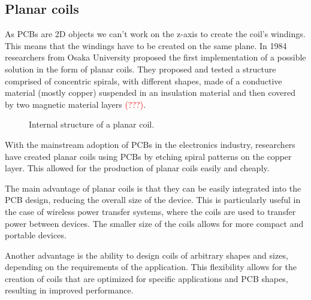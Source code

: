 \subsection{Planar coils}
As PCBs are 2D objects we can't work on the z-axis to create the coil's windings. This means that the windings have to be created on the same plane. 
In 1984 researchers from Osaka University proposed the first implementation of a possible solution in the form of planar coils.
They proposed and tested a structure comprised of concentric spirals, with different shapes, made of a conductive material (mostly copper) suspended in an insulation material and then covered by two magnetic material layers \textcolor{red}{(???)}\cite{OG_plan_coils}. %

\begin{figure}
    \centering
    \resizebox{.8\linewidth}{!}{}
    \caption{Internal structure of a planar coil.}
    \label{fig:Planar_coil_structure}
\end{figure}


With the mainstream adoption of PCBs in the electronics industry, researchers have created planar coils using PCBs by etching spiral patterns on the copper layer. This allowed for the production of planar coils easily and cheaply.

The main advantage of planar coils is that they can be easily integrated into the PCB design, reducing the overall size of the device. This is particularly useful in the case of wireless power transfer systems, where the coils are used to transfer power between devices. The smaller size of the coils allows for more compact and portable devices.

Another advantage is the ability to design coils of arbitrary shapes and sizes, depending on the requirements of the application. This flexibility allows for the creation of coils that are optimized for specific applications and PCB shapes, resulting in improved performance.

